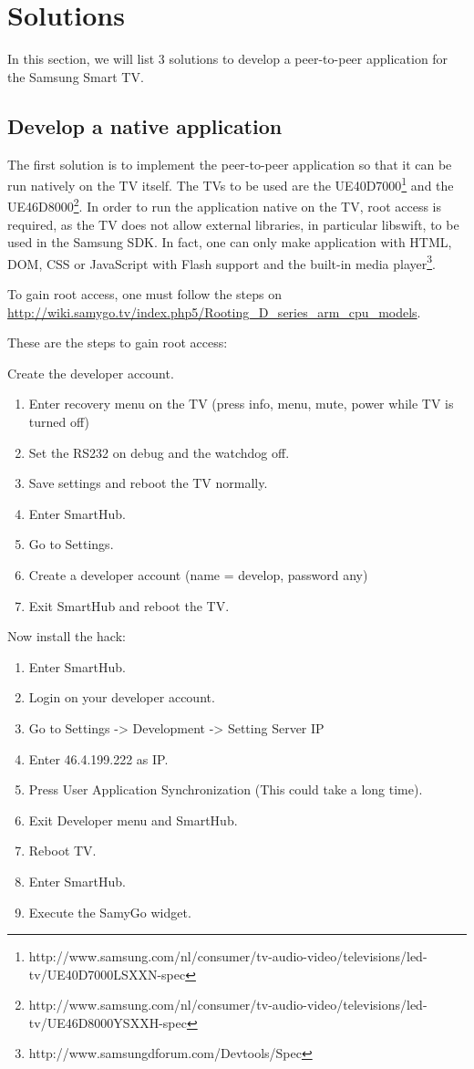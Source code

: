 \chapter*{Solutions}

In this section, we will list 3 solutions to develop a peer-to-peer application for the Samsung Smart TV.

\section*{Develop a native application}
\label{sec:smarttv}
The first solution is to implement the peer-to-peer application so that it can be run natively on the TV itself.
The TVs to be used are the UE40D7000\footnote{http://www.samsung.com/nl/consumer/tv-audio-video/televisions/led-tv/UE40D7000LSXXN-spec} 
and the UE46D8000\footnote{http://www.samsung.com/nl/consumer/tv-audio-video/televisions/led-tv/UE46D8000YSXXH-spec}.
In order to run the application native on the TV, root access is required, 
as the TV does not allow external libraries, in particular libswift, to be used in the Samsung SDK.
In fact, one can only make application with HTML, DOM, CSS or JavaScript with Flash support and the built-in media player\footnote{http://www.samsungdforum.com/Devtools/Spec}.

To gain root access, one must follow the steps on \url{http://wiki.samygo.tv/index.php5/Rooting_D_series_arm_cpu_models}.

These are the steps to gain root access:

Create the developer account.
\begin{enumerate}
\item Enter recovery menu on the TV (press info, menu, mute, power while TV is turned off)
\item Set the RS232 on debug and the watchdog off.
\item Save settings and reboot the TV normally.
\item Enter SmartHub.
\item Go to Settings.
\item Create a developer account (name = develop, password any)
\item Exit SmartHub and reboot the TV.
\end{enumerate}

\newpage
Now install the hack:

\begin{enumerate}
\item Enter SmartHub.
\item Login on your developer account.
\item Go to Settings -> Development -> Setting Server IP
\item Enter 46.4.199.222 as IP.
\item Press User Application Synchronization (This could take a long time).
\item Exit Developer menu and SmartHub.
\item Reboot TV.
\item Enter SmartHub.
\item Execute the SamyGo widget.
\end{enumerate} 



